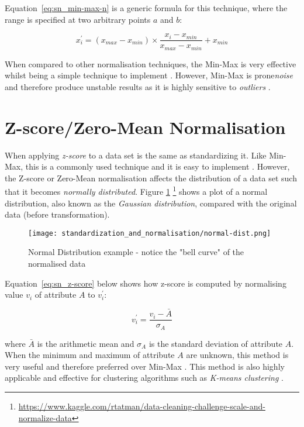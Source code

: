 Equation~\ref{eq:sn_min-max-n} is a generic formula for this technique, where the range is specified at two arbitrary points $a$ and $b$:

\begin{equation}
\label{eq:sn_min-max-n}
x^{\prime}_{i} = (x_{max} - x_{min}) \times \frac{x_{i} - x_{min}}{x_{max} - x_{min}} + x_{min}
\end{equation}

 When compared to other normalisation techniques, the Min-Max is very effective whilst being a simple technique to implement \citep{al2006data}.  However, Min-Max is prone\emph{noise} and therefore produce unstable results as it is highly sensitive to \emph{outliers} \citep{jain2005score}.

\section{Z-score/Zero-Mean Normalisation}
When applying \emph{z-score} to a data set is the same as standardizing it.  Like Min-Max, this is a commonly used technique and it is easy to implement \citep{jain2005score}.  However, the Z-score or Zero-Mean normalisation affects the distribution of a data set such that it becomes \emph{normally distributed}.  Figure \ref{fig:sn_normal-dist} \footnote{\url{https://www.kaggle.com/rtatman/data-cleaning-challenge-scale-and-normalize-data}} shows a plot of a normal distribution, also known as the \emph{Gaussian distribution}, compared with the original data (before transformation).

\begin{figure}
	\texttt{[image: standardization\_and\_normalisation/normal-dist.png]}
	\caption{Normal Distribution example - notice the "bell curve" of the normalised data}
	\label{fig:sn_normal-dist}
\end{figure}

Equation~\ref{eq:sn_z-score} below shows how z-score is computed by normalising value $v_{i}$ of attribute $A$ to $v^{\prime}_{i}$:

\begin{equation}
\label{eq:sn_z-score}
v^{\prime}_{i} = \frac{v_{i} - \bar{A}}{\sigma_{A}}
\end{equation}

where $\bar{A}$ is the arithmetic mean and $\sigma_{A}$ is the standard deviation of attribute $A$.  When the minimum and maximum of attribute $A$ are unknown, this method is very useful and therefore preferred over Min-Max \citep{han2011data}.  This method is also highly applicable and effective for clustering algorithms such as \emph{K-means clustering} \citep{mohamad2013standardization} \citep{cheadle2003analysis}.

